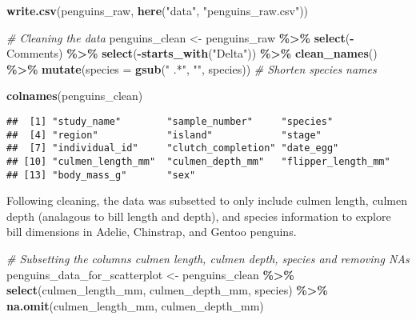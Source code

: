 \documentclass[
]{article}
\newenvironment{Shaded}{\begin{snugshade}}{\end{snugshade}}
\newcommand{\AttributeTok}[1]{\textcolor[rgb]{0.13,0.29,0.53}{#1}}
\newcommand{\CommentTok}[1]{\textcolor[rgb]{0.56,0.35,0.01}{\textit{#1}}}
\newcommand{\FunctionTok}[1]{\textcolor[rgb]{0.13,0.29,0.53}{\textbf{#1}}}
\newcommand{\NormalTok}[1]{#1}
\newcommand{\OtherTok}[1]{\textcolor[rgb]{0.56,0.35,0.01}{#1}}
\newcommand{\SpecialCharTok}[1]{\textcolor[rgb]{0.81,0.36,0.00}{\textbf{#1}}}
\newcommand{\StringTok}[1]{\textcolor[rgb]{0.31,0.60,0.02}{#1}}
\begin{document}
\begin{Shaded}
\begin{Highlighting}[]
\FunctionTok{write.csv}\NormalTok{(penguins\_raw, }\FunctionTok{here}\NormalTok{(}\StringTok{"data"}\NormalTok{, }\StringTok{"penguins\_raw.csv"}\NormalTok{))}

\CommentTok{\# Cleaning the data}
\NormalTok{penguins\_clean }\OtherTok{\textless{}{-}}\NormalTok{ penguins\_raw }\SpecialCharTok{\%\textgreater{}\%}
\FunctionTok{select}\NormalTok{(}\SpecialCharTok{{-}}\NormalTok{Comments) }\SpecialCharTok{\%\textgreater{}\%}
\FunctionTok{select}\NormalTok{(}\SpecialCharTok{{-}}\FunctionTok{starts\_with}\NormalTok{(}\StringTok{"Delta"}\NormalTok{)) }\SpecialCharTok{\%\textgreater{}\%}
\FunctionTok{clean\_names}\NormalTok{() }\SpecialCharTok{\%\textgreater{}\%}
\FunctionTok{mutate}\NormalTok{(}\AttributeTok{species =} \FunctionTok{gsub}\NormalTok{(}\StringTok{" .*"}\NormalTok{, }\StringTok{""}\NormalTok{, species))  }\CommentTok{\# Shorten species names}

\FunctionTok{colnames}\NormalTok{(penguins\_clean)}
\end{Highlighting}
\end{Shaded}

\begin{verbatim}
##  [1] "study_name"        "sample_number"     "species"          
##  [4] "region"            "island"            "stage"            
##  [7] "individual_id"     "clutch_completion" "date_egg"         
## [10] "culmen_length_mm"  "culmen_depth_mm"   "flipper_length_mm"
## [13] "body_mass_g"       "sex"
\end{verbatim}

Following cleaning, the data was subsetted to only include culmen
length, culmen depth (analagous to bill length and depth), and species
information to explore bill dimensions in Adelie, Chinstrap, and Gentoo
penguins.

\begin{Shaded}
\begin{Highlighting}[]
\CommentTok{\# Subsetting the columns culmen length, culmen depth, species and removing NAs}
\NormalTok{penguins\_data\_for\_scatterplot }\OtherTok{\textless{}{-}}\NormalTok{ penguins\_clean }\SpecialCharTok{\%\textgreater{}\%}
  \FunctionTok{select}\NormalTok{(culmen\_length\_mm, culmen\_depth\_mm, species) }\SpecialCharTok{\%\textgreater{}\%}
  \FunctionTok{na.omit}\NormalTok{(culmen\_length\_mm, culmen\_depth\_mm)}
\end{Highlighting}
\end{Shaded}
\end{document}
